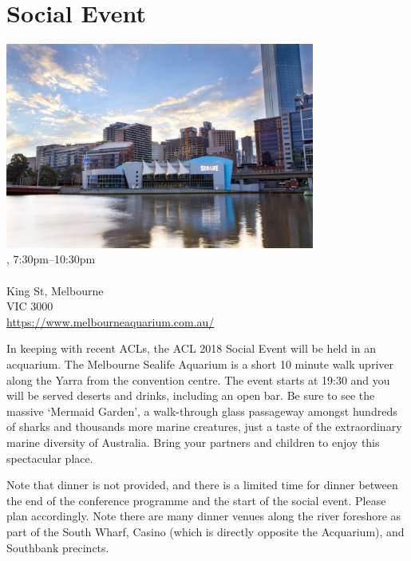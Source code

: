\clearpage
\section[Social Event: \daydate, 7:30pm]{Social Event}
\setheaders{}{\daydateyear}

\begin{center}

\includegraphics[width=4in]{content/day2/aquarium.jpg} \\


\daydateyear, 7:30pm--10:30pm \vspace{1em}\\
\SocialLoc\\
King St, Melbourne \\
VIC 3000 \\
\url{https://www.melbourneaquarium.com.au/}
\end{center}

In keeping with recent ACLs, the ACL 2018 Social Event will be held in
an acquarium.  The Melbourne Sealife Aquarium is a short 10 minute walk
upriver along the Yarra from the convention centre. The event starts at
19:30 and you will be served deserts and drinks, including an open bar.
Be sure to see the massive `Mermaid Garden', a walk-through glass
passageway amongst hundreds of sharks and thousands more marine
creatures, just a taste of the extraordinary marine diversity of
Australia. Bring your partners and children to enjoy this spectacular
place.

Note that dinner is not provided, and there is a limited time for dinner
between the end of the conference programme and the start of the social
event.  Please plan accordingly.  Note there are many dinner venues
along the river foreshore as part of the South Wharf, Casino (which is
directly opposite the Acquarium), and Southbank precincts.
